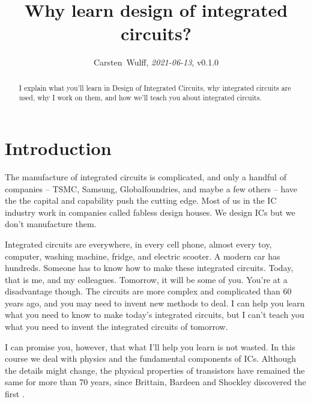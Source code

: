 \documentclass[technote,10pt,a4paper]{IEEEtran}
\begin{document}

\title{Why learn design of integrated circuits?}
\author{Carsten~Wulff, \textit{2021-06-13}, v0.1.0 }
\maketitle

\begin{abstract}
I explain what you'll learn in Design of Integrated Circuits, why integrated
circuits are used, why I work on them, and how we'll teach you about integrated circuits.
\end{abstract}

\section{Introduction}
The manufacture of integrated circuits is complicated, and only a handful of
companies -- TSMC, Samsung, Globalfoundries, and maybe a few others -- have the the capital and capability push
the cutting edge. Most of us in the IC industry work in companies called fabless design houses.
We design ICs but we don't manufacture them.

Integrated circuits are everywhere, in every cell phone, almost every toy,
computer, washing machine, fridge, and electric scooter. A modern car has hundreds.
Someone has to know how to make these integrated circuits. Today, that is me,
and my colleagues. Tomorrow, it will be some of you. You're at a disadvantage though. The
circuits are more complex and complicated than 60 years ago, and you may need to invent new
methods to deal. I can help you learn what you need to know
to make today's integrated circuits, but I can't teach you what you need to
invent the integrated circuits of tomorrow.

I can promise you, however, that what I'll help you learn is not wasted. In this
course we deal with physics and the fundamental components of ICs. Although the details might change,
the physical properties of transistors have remained the same for more than 70
years, since Brittain, Bardeen and Shockley discovered the first
\cite{bbs47}.

\end{document}

